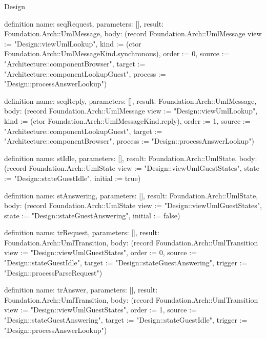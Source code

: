 \begin{lexlean}{Design}
\begin{semanticmodule}
definition{
  name: seqRequest,
  parameters: [],
  result: Foundation.Arch::UmlMessage,
  body: (record Foundation.Arch::UmlMessage {view := "Design::viewUmlLookup", kind := (ctor Foundation.Arch::UmlMessageKind.synchronous), order := 0, source := "Architecture::componentBrowser", target := "Architecture::componentLookupGuest", process := "Design::processAnswerLookup"})
}

definition{
  name: seqReply,
  parameters: [],
  result: Foundation.Arch::UmlMessage,
  body: (record Foundation.Arch::UmlMessage {view := "Design::viewUmlLookup", kind := (ctor Foundation.Arch::UmlMessageKind.reply), order := 1, source := "Architecture::componentLookupGuest", target := "Architecture::componentBrowser", process := "Design::processAnswerLookup"})
}

definition{
  name: stIdle,
  parameters: [],
  result: Foundation.Arch::UmlState,
  body: (record Foundation.Arch::UmlState {view := "Design::viewUmlGuestStates", state := "Design::stateGuestIdle", initial := true})
}

definition{
  name: stAnswering,
  parameters: [],
  result: Foundation.Arch::UmlState,
  body: (record Foundation.Arch::UmlState {view := "Design::viewUmlGuestStates", state := "Design::stateGuestAnswering", initial := false})
}

definition{
  name: trRequest,
  parameters: [],
  result: Foundation.Arch::UmlTransition,
  body: (record Foundation.Arch::UmlTransition {view := "Design::viewUmlGuestStates", order := 0, source := "Design::stateGuestIdle", target := "Design::stateGuestAnswering", trigger := "Design::processParseRequest"})
}

definition{
  name: trAnswer,
  parameters: [],
  result: Foundation.Arch::UmlTransition,
  body: (record Foundation.Arch::UmlTransition {view := "Design::viewUmlGuestStates", order := 1, source := "Design::stateGuestAnswering", target := "Design::stateGuestIdle", trigger := "Design::processAnswerLookup"})
}
\end{semanticmodule}
\end{lexlean}
